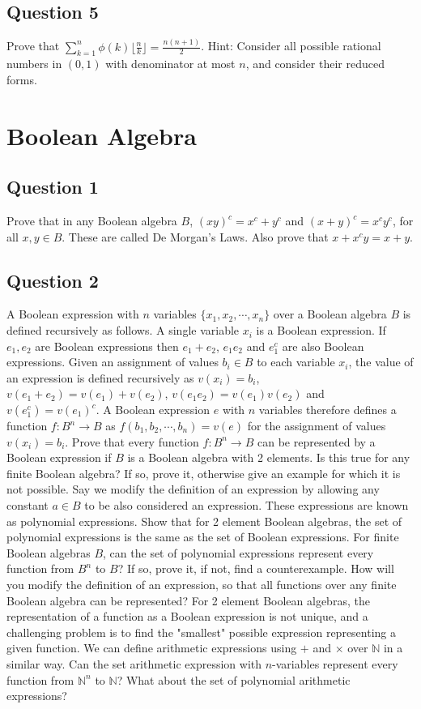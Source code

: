 \documentclass[12pt]{report}
\begin{document}
\section*{Question 5}
Prove that $\sum\limits_{k = 1}^{n}\phi(k)\lfloor \frac{n}{k}\rfloor = \frac{n(n + 1)}{2}$. Hint: Consider all possible rational numbers in $(0, 1)$ with denominator at most $n$, and consider their reduced forms.
\chapter{Boolean Algebra}
\section*{Question 1}
Prove that in any Boolean algebra $B$, $(x y)^{c} = x^{c} + y^{c}$ and $(x + y)^{c} = x^{c} y^{c}$, for all $x, y \in B$. These are called De Morgan's Laws. Also prove that $x + x^{c} y = x + y$.
\section*{Question 2}
A Boolean expression with $n$ variables $\{x_{1}, x_{2}, \cdots, x_{n}\}$ over a Boolean algebra $B$ is defined recursively as follows. A single variable $x_{i}$ is a Boolean expression. If $e_{1}, e_{2}$ are Boolean expressions then $e_{1} + e_{2}$, $e_{1} e_{2}$ and $e_{1}^{c}$ are also Boolean expressions. Given an assignment of values $b_{i} \in B$ to each variable $x_{i}$, the value of an expression is defined recursively as $v(x_{i}) = b_{i}$, $v(e_{1} + e_{2}) = v(e_{1}) + v(e_{2})$, $v(e_{1}e_{2}) = v(e_{1})v(e_{2})$ and $v(e_{1}^{c}) = v(e_{1})^{c}$. A Boolean expression $e$ with $n$ variables therefore defines a function $f : B^{n} \rightarrow B$ as $f(b_{1}, b_{2}, \cdots, b_{n}) = v(e)$ for the assignment of values $v(x_{i}) = b_{i}$. Prove that every function $f : B^{n} \rightarrow B$ can be represented by a Boolean expression if $B$ is a Boolean algebra with 2 elements. Is this true for any finite Boolean algebra? If so, prove it, otherwise give an example for which it is not possible. Say we modify the definition of an expression by allowing any constant $a \in B$ to be also considered an expression. These expressions are known as polynomial expressions. Show that for 2 element Boolean algebras, the set of polynomial expressions is the same as the set of Boolean expressions.  For finite Boolean algebras $B$, can the set of polynomial expressions represent every function from $B^{n}$ to $B$? If so, prove it, if not, find a counterexample. How will you modify the definition of an expression, so that all functions over any finite Boolean algebra can be represented? For 2 element Boolean algebras, the representation of a function as a Boolean expression is not unique, and a challenging problem is to find the "smallest" possible expression representing a given function. We can define arithmetic expressions using $+$ and $\times$ over $\mathbb{N}$ in a similar way. Can the set arithmetic expression with $n$-variables represent every function from $\mathbb{N}^{n}$ to $\mathbb{N}$? What about the set of polynomial arithmetic expressions?
\end{document}
